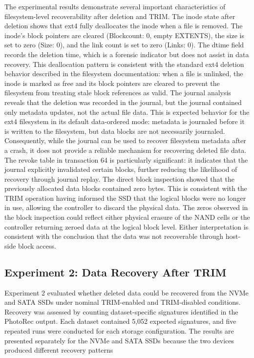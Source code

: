 The experimental results demonstrate several important characteristics of filesystem-level recoverability after deletion and TRIM. The inode state after deletion shows 
that ext4 fully deallocates the inode when a file is removed. The inode's block pointers are cleared (Blockcount: 0, empty EXTENTS), the size is set to zero (Size: 0), 
and the link count is set to zero (Links: 0). The dtime field records the deletion time, which is a forensic indicator but does not assist in data recovery. This 
deallocation pattern is consistent with the standard ext4 deletion behavior described in the filesystem documentation: when a file is unlinked, the inode is marked as 
free and its block pointers are cleared to prevent the filesystem from treating stale block references as valid. The journal analysis reveals that the deletion was 
recorded in the journal, but the journal contained only metadata updates, not the actual file data. This is expected behavior for the ext4 filesystem in its default 
data-ordered mode: metadata is journaled before it is written to the filesystem, but data blocks are not necessarily journaled. Consequently, while the journal can be 
used to recover filesystem metadata after a crash, it does not provide a reliable mechanism for recovering deleted file data. The revoke table in transaction 64 is 
particularly significant: it indicates that the journal explicitly invalidated certain blocks, further reducing the likelihood of recovery through journal replay. The 
direct block inspection showed that the previously allocated data blocks contained zero bytes. This is consistent with the TRIM operation having informed the SSD that 
the logical blocks were no longer in use, allowing the controller to discard the physical data. The zeros observed in the block inspection could reflect either physical 
erasure of the NAND cells or the controller returning zeroed data at the logical block level. Either interpretation is consistent with the conclusion that the data was 
not recoverable through host-side block access. 

\subsection{Experiment 2: Data Recovery After TRIM}
Experiment 2 evaluated whether deleted data could be recovered from the NVMe and SATA SSDs under nominal TRIM-enabled and TRIM-disabled conditions. Recovery was 
assessed by counting dataset-specific signatures identified in the PhotoRec output. Each dataset contained 5,052 expected signatures, and five repeated runs were 
conducted for each storage configuration. The results are presented separately for the NVMe and SATA SSDs because the two devices produced different recovery patterns

